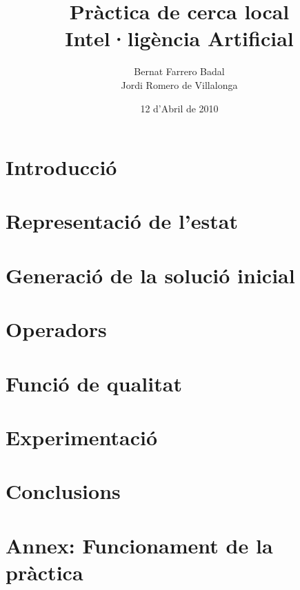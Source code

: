 \documentclass[a4paper]{report}
\author{Bernat Farrero Badal \\Jordi Romero de Villalonga}
\title{Pràctica de cerca local \\ Intel·ligència Artificial}
\date{12 d'Abril de 2010}
\begin{document}
\maketitle

\tableofcontents

\newpage

\chapter{Introducció}


\chapter{Representació de l'estat}


\chapter{Generació de la solució inicial}


\chapter{Operadors}


\chapter{Funció de qualitat}


\chapter{Experimentació}


\chapter{Conclusions}


\chapter{Annex: Funcionament de la pràctica}

\end{document}
